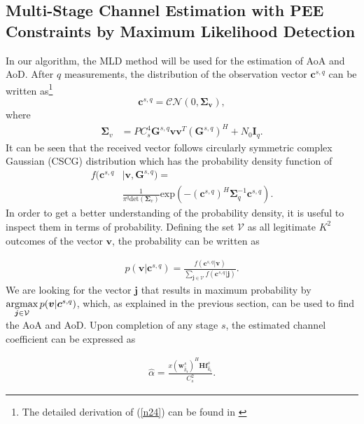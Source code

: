 \documentclass{ieeeaccess}
\newcommand{\argmax}{\operatornamewithlimits{argmax}}
\begin{document}
\subsection{Multi-Stage Channel Estimation with PEE Constraints by Maximum Likelihood Detection}
In our algorithm, the MLD method will be used for the estimation of AoA and AoD. After $q$ measurements, the distribution of the observation vector $\boldsymbol{c}^{s,q}$ can be written as\footnote{The detailed derivation of (\ref{n24}) can be found in \cite{overlap}}
\begin{equation} \label{n24}
    \boldsymbol{c}^{s,q} = \mathcal{C}\mathcal{N}(0, \boldsymbol{\Sigma_v} ),
\end{equation}
where
\begin{align} \label{n25}
\boldsymbol{\Sigma}_{v} &= PC_s^4\boldsymbol{G}^{s,q}\boldsymbol{v}\boldsymbol{v}^T(\boldsymbol{G}^{s,q})^H + N_0 \boldsymbol{I}_{q}.
\end{align}
It can be seen that the received vector follows circularly symmetric complex Gaussian (CSCG) distribution which has the probability density function of
\begin{align} \label{n26}
    f(\boldsymbol{c}^{s,q}&|\boldsymbol{v},\boldsymbol{G}^{s,q}) =\\ & \frac{1}{\pi^{q}\text{det}(\boldsymbol{\Sigma}_{v})} \text{exp}(-(\boldsymbol{c}^{s,q})^H \boldsymbol{\Sigma}^{-1}_{q} {\boldsymbol{c}^{s,q}}). \nonumber
\end{align}
In order to get a better understanding of the probability density, it is useful to inspect them in terms of probability. Defining the set $\mathcal{V}$ as all legitimate $K^2$ outcomes of the vector $\boldsymbol{v}$, the probability can be written as

\begin{align} \label{n27}
   p(\boldsymbol{v}|\boldsymbol{c}^{s,q})  =  \frac{ f(\boldsymbol{c}^{s,q}|\boldsymbol{v}) }{ \sum\limits_{\boldsymbol{j}\in {\mathcal{V}} }  f(\boldsymbol{c}^{s,q}|\boldsymbol{j})   }.
\end{align}
We are looking for the vector $\boldsymbol{j}$ that results in maximum probability by $ \argmax\limits_{\boldsymbol{j} \in {\mathcal{V}}}p(\boldsymbol{v}|\boldsymbol{c}^{s,q})$, which, as explained in the previous section, can be used to find the AoA and AoD. Upon completion of any stage $s$, the estimated channel coefficient can be expressed as

\begin{align}\label{n28}
\hat{\alpha} =  \frac{x (\boldsymbol{w}^s_{\hat{k}_\textrm{r}})^H\boldsymbol{H}\boldsymbol{f}^s_{\hat{k}_\textrm{t}}}{C^2_{s} }.
\end{align}
\end{document}
